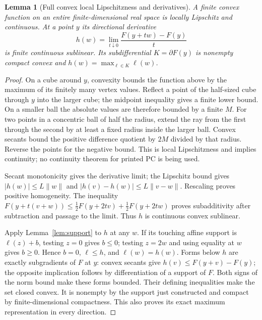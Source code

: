 \documentclass[11pt]{article}
\newtheorem{lemma}[theorem]{Lemma}
\begin{document}
\begin{lemma}[Full convex local Lipschitzness and derivatives]\label{lem:derivative}
A finite convex function on an entire finite-dimensional real space is locally Lipschitz and continuous. At a point $y$ its directional derivative
\[
 h(w)=\lim_{t\downarrow0}\frac{F(y+tw)-F(y)}t
\]
is finite continuous sublinear. Its subdifferential $K=\partial F(y)$ is nonempty compact convex and $h(w)=\max_{\ell\in K}\ell(w)$.
\end{lemma}
\begin{proof}
On a cube around $y$, convexity bounds the function above by the maximum of its finitely many vertex values. Reflect a point of the half-sized cube through $y$ into the larger cube; the midpoint inequality gives a finite lower bound. On a smaller ball the absolute values are therefore bounded by a finite $M$. For two points in a concentric ball of half the radius, extend the ray from the first through the second by at least a fixed radius inside the larger ball. Convex secants bound the positive difference quotient by $2M$ divided by that radius. Reverse the points for the negative bound. This is local Lipschitzness and implies continuity; no continuity theorem for printed PC is being used.

Secant monotonicity gives the derivative limit; the Lipschitz bound gives $|h(w)|\leq L\|w\|$ and $|h(v)-h(w)|\leq L\|v-w\|$. Rescaling proves positive homogeneity. The inequality
$F(y+t(v+w))\leq\tfrac12F(y+2tv)+\tfrac12F(y+2tw)$ proves subadditivity after subtraction and passage to the limit. Thus $h$ is continuous convex sublinear.

Apply Lemma~\ref{lem:support} to $h$ at any $w$. If its touching affine support is $\ell(z)+b$, testing $z=0$ gives $b\leq0$; testing $z=2w$ and using equality at $w$ gives $b\geq0$. Hence $b=0$, $\ell\leq h$, and $\ell(w)=h(w)$. Forms below $h$ are exactly subgradients of $F$ at $y$: convex secants give $h(v)\leq F(y+v)-F(y)$; the opposite implication follows by differentiation of a support of $F$. Both signs of the norm bound make these forms bounded. Their defining inequalities make the set closed convex. It is nonempty by the support just constructed and compact by finite-dimensional compactness. This also proves its exact maximum representation in every direction.
\end{proof}
\end{document}
